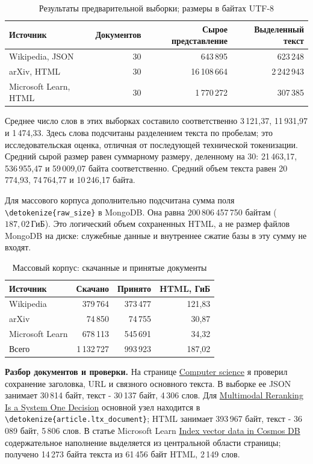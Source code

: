 \documentclass[pdf,unicode,12pt,a4paper,oneside,fleqn]{article}
\newcommand{\partlabel}[1]{\par\Needspace{4\baselineskip}\medskip\textbf{#1.}\quad}
\DeclareRobustCommand{\code}[1]{\expandafter\nolinkurl\expandafter{\detokenize{#1}}}
\newcommand{\GiB}{\,\text{ГиБ}}
\begin{document}
\begin{table}[htbp]\centering
\caption{Результаты предварительной выборки; размеры в байтах UTF-8}
\begin{tabularx}{\textwidth}{Yrrr}
\toprule
Источник & Документов & Сырое представление & Выделенный текст\\
\midrule
Wikipedia, JSON & 30 & 643\,895 & 623\,248\\
arXiv, HTML & 30 & 16\,108\,664 & 2\,242\,943\\
Microsoft Learn, HTML & 30 & 1\,770\,272 & 307\,385\\
\bottomrule
\end{tabularx}
\end{table}

Среднее число слов в этих выборках составило соответственно 3\,121,37,
11\,931,97 и 1\,474,33. Здесь слова подсчитаны разделением текста по пробелам;
это исследовательская оценка, отличная от последующей технической токенизации.
Средний сырой размер равен суммарному размеру, деленному на 30: 21\,463,17,
536\,955,47 и 59\,009,07 байта соответственно. Средний объем текста равен
20\,774,93, 74\,764,77 и 10\,246,17 байта.

Для массового корпуса дополнительно подсчитана сумма поля \code{raw_size}
в MongoDB. Она равна 200\,806\,457\,750 байтам ($187{,}02\GiB$).
Это логический объем сохраненных HTML, а не размер файлов MongoDB на диске:
служебные данные и внутреннее сжатие базы в эту сумму не входят.

\begin{table}[htbp]\centering
\caption{Массовый корпус: скачанные и принятые документы}
\begin{tabularx}{\textwidth}{Yrrr}
\toprule
Источник & Скачано & Принято & HTML, ГиБ\\
\midrule
Wikipedia & 379\,764 & 373\,477 & 121,83\\
arXiv & 74\,850 & 74\,755 & 30,87\\
Microsoft Learn & 678\,113 & 545\,691 & 34,32\\
\midrule
Всего & 1\,132\,727 & 993\,923 & 187,02\\
\bottomrule
\end{tabularx}
\end{table}

\partlabel{Разбор документов и проверки}
На странице \href{https://en.wikipedia.org/wiki/Computer_science}{Computer science}
я проверил сохранение заголовка, URL и связного основного текста.
В выборке ее JSON занимает 30\,814 байт, текст - 30\,137 байт, 4\,306 слов.
Для \href{https://arxiv.org/html/2610.28435v1}{Multimodal Reranking Is a System One Decision}
основной узел находится в \code{article.ltx_document}; HTML занимает
393\,967 байт, текст - 36\,089 байт, 5\,806 слов. В статье Microsoft Learn
\href{https://learn.microsoft.com/en-us/cosmos-db/index-vector-data}{Index vector data in Cosmos DB}
содержательное наполнение выделяется из центральной области страницы;
получено 14\,273 байта текста из 61\,456 байт HTML, 2\,149 слов.
\end{document}
